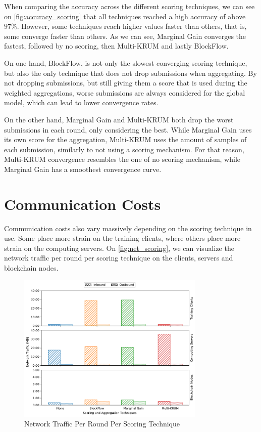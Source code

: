 When comparing the accuracy across the different scoring techniques, we can see on \autoref{fig:accuracy_scoring} that all techniques reached a high accuracy of above $97\%$. However, some techniques reach higher values faster than others, that is, some converge faster than others. As we can see, Marginal Gain converges the fastest, followed by no scoring, then Multi-KRUM and lastly BlockFlow.

On one hand, BlockFlow, is not only the slowest converging scoring technique, but also the only technique that does not drop submissions when aggregating. By not dropping submissions, but still giving them a score that is used during the weighted aggregations, worse submissions are always considered for the global model, which can lead to lower convergence rates. 

On the other hand, Marginal Gain and Multi-KRUM both drop the worst submissions in each round, only considering the best. While Marginal Gain uses its own score for the aggregation, Multi-KRUM uses the amount of samples of each submission, similarly to not using a scoring mechanism. For that reason, Multi-KRUM convergence resembles the one of no scoring mechanism, while Marginal Gain has a smoothest convergence curve.

\section{Communication Costs}

Communication costs also vary massively depending on the scoring technique in use. Some place more strain on the training clients, where others place more strain on the computing servers. On \autoref{fig:net_scoring}, we can visualize the network traffic per round per scoring technique on the clients, servers and blockchain nodes.

\begin{figure}[!ht]
    \centering
    \centering
    \includegraphics[width=0.8\textwidth]{graphics/scoring/net.pdf}
    \caption{Network Traffic Per Round Per Scoring Technique}
    \label{fig:net_scoring}
\end{figure}

